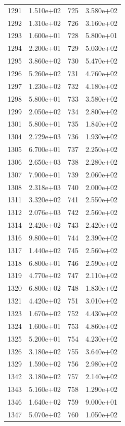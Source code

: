 \documentclass[12pt]{article}
\begin{document}
\begin{longtable}{@{}cccc@{}}
1291 & 1.510e+02 & 725 & 3.580e+02 \\
1292 & 1.310e+02 & 726 & 3.160e+02 \\
1293 & 1.600e+01 & 728 & 5.800e+01 \\
1294 & 2.200e+01 & 729 & 5.030e+02 \\
1295 & 3.860e+02 & 730 & 5.470e+02 \\
1296 & 5.260e+02 & 731 & 4.760e+02 \\
1297 & 1.230e+02 & 732 & 4.180e+02 \\
1298 & 5.800e+01 & 733 & 3.580e+02 \\
1299 & 2.050e+02 & 734 & 2.800e+02 \\
1301 & 5.800e+01 & 735 & 1.840e+02 \\
1304 & 2.729e+03 & 736 & 1.930e+02 \\
1305 & 6.700e+01 & 737 & 2.250e+02 \\
1306 & 2.650e+03 & 738 & 2.280e+02 \\
1307 & 7.900e+01 & 739 & 2.060e+02 \\
1308 & 2.318e+03 & 740 & 2.000e+02 \\
1311 & 3.320e+02 & 741 & 2.550e+02 \\
1312 & 2.076e+03 & 742 & 2.560e+02 \\
1314 & 2.420e+02 & 743 & 2.420e+02 \\
1316 & 9.800e+01 & 744 & 2.390e+02 \\
1317 & 1.440e+02 & 745 & 2.560e+02 \\
1318 & 6.800e+01 & 746 & 2.590e+02 \\
1319 & 4.770e+02 & 747 & 2.110e+02 \\
1320 & 6.800e+02 & 748 & 1.830e+02 \\
1321 & 4.420e+02 & 751 & 3.010e+02 \\
1323 & 1.670e+02 & 752 & 4.430e+02 \\
1324 & 1.600e+01 & 753 & 4.860e+02 \\
1325 & 5.200e+01 & 754 & 4.230e+02 \\
1326 & 3.180e+02 & 755 & 3.640e+02 \\
1329 & 1.590e+02 & 756 & 2.980e+02 \\
1342 & 3.180e+02 & 757 & 2.140e+02 \\
1343 & 5.160e+02 & 758 & 1.290e+02 \\
1346 & 1.640e+02 & 759 & 9.000e+01 \\
1347 & 5.070e+02 & 760 & 1.050e+02 \\

\bottomrule
\end{longtable}
\end{document}
